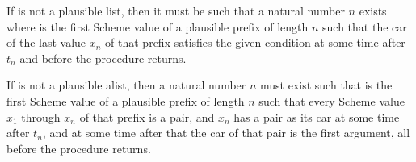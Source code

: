 \begin{entry}{%
}


If  is not a plausible list, then it must be such that a
natural number $n$ exists where  is the first Scheme value of a
plausible prefix of length $n$ such that
the car of the last value $x_n$ of that
prefix satisfies the given condition at some time after $t_n$ and before
the procedure returns.
\end{entry}

\begin{entry}{%
}


If  is not a plausible alist, then a natural number $n$ must
exist such that  is the first Scheme value of a plausible
prefix of length $n$ such that every Scheme value $x_1$ through $x_n$
of that prefix is a pair, and $x_n$ has a pair as its car at some time
after $t_n$, and at some time after that the car of that pair is the
first argument, all before the procedure returns.
\end{entry}

